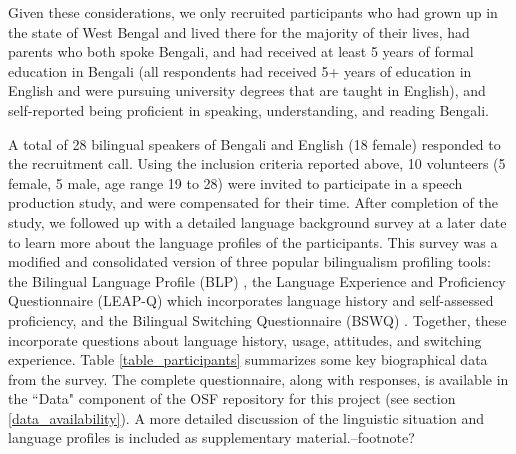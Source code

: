 \documentclass[12 pt]{article}
\begin{document}
Given these considerations, we only recruited participants who had grown up in the state of West Bengal and lived there for the majority of their lives, had parents who both spoke Bengali, and had received at least 5 years of formal education in Bengali (all respondents had received 5+ years of education in English and were pursuing university degrees that are taught in English), and self-reported being proficient in speaking, understanding, and reading Bengali. 
   
A total of 28 bilingual speakers of Bengali and English (18 female) responded to the recruitment call. Using the inclusion criteria reported above, 10 volunteers (5 female, 5 male, age range 19 to 28) were invited to participate in a speech production study, and were compensated for their time. After completion of the study, we followed up with a detailed language background survey at a later date to learn more about the language profiles of the participants. This survey was a modified and consolidated version of three popular bilingualism profiling tools: the Bilingual Language Profile (BLP) \citep{blp}, the Language Experience and Proficiency Questionnaire (LEAP-Q) \citep{leap-q} which incorporates language history and self-assessed proficiency, and the Bilingual Switching Questionnaire (BSWQ) \citep{language_switching_questionnaire}. Together, these incorporate questions about language history, usage, attitudes, and switching experience. Table \ref{table_participants} summarizes some key biographical data from the survey. \alert{The complete questionnaire, along with responses, is available in the ``Data" component of the OSF repository for this project (see section \ref{data_availability}). A more detailed discussion of the linguistic situation and language profiles is included as supplementary material.--footnote?}
\end{document}
